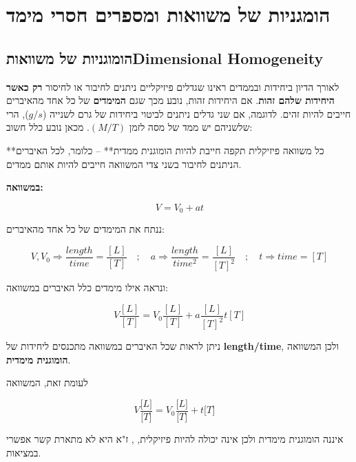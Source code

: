 \documentclass[
  hebrew,
  letterpaper,
  DIV=11,
  numbers=noendperiod]{scrreprt}
\begin{document}
\section{\texorpdfstring{{הומגניות של משוואות ומספרים חסרי
מימד}}{הומגניות של משוואות ומספרים חסרי מימד}}\label{ux5d4ux5d5ux5deux5d2ux5e0ux5d9ux5d5ux5ea-ux5e9ux5dc-ux5deux5e9ux5d5ux5d5ux5d0ux5d5ux5ea-ux5d5ux5deux5e1ux5e4ux5e8ux5d9ux5dd-ux5d7ux5e1ux5e8ux5d9-ux5deux5d9ux5deux5d3}

\subsection{\texorpdfstring{{הומוגניות של משוואות}Dimensional
Homogeneity{}}{הומוגניות של משוואותDimensional Homogeneity}}\label{ux5d4ux5d5ux5deux5d5ux5d2ux5e0ux5d9ux5d5ux5ea-ux5e9ux5dc-ux5deux5e9ux5d5ux5d5ux5d0ux5d5ux5eadimensional-homogeneity}

{לאורך הדיון ביחידות ובממדים ראינו שגדלים פיזיקליים ניתנים לחיבור או
לחיסור \textbf{רק כאשר היחידות שלהם זהות}}. {אם היחידות זהות, נובע מכך
שגם \textbf{המימדים} של כל אחד מהאיברים חייבים להיות זהים. לדוגמה, אם
שני גדלים ניתנים לביטוי ביחידות של גרם לשנייה} (\(g/s\)), {הרי שלשניהם
יש ממד של מסה לזמן} \((M/T)\). {מכאן נובע כלל חשוב}:

{**כל משוואה פיזיקלית תקפה חייבת להיות הומוגנית ממדית**} -- {כלומר, לכל
האיברים הניתנים לחיבור בשני צדי המשוואה חייבים להיות אותם ממדים}.

\textbf{במשוואה:}

\[
V = V_{0} + a t
\]

ננתח את המימדים של כל אחד מהאיברים:

\[
V, V_{0} \Longrightarrow \frac{length}{time} = \frac{[L]}{[T]} \quad ; \quad
a \Rightarrow \frac{length}{time^{2}} = \frac{[L]}{[T]^{2}} \quad ; \quad
t \Rightarrow time = [T]
\]

ונראה אילו מימדים כלל האיברים במשוואה:

\[
V \frac{[L]}{[T]} = V_{0} \frac{[L]}{[T]} + a \frac{[L]}{[T]^{2}} t [T]
\]

ניתן לראות שכל האיברים במשוואה מתכנסים ליחידות של \textbf{length/time},
ולכן המשוואה \textbf{הומוגנית מימדית}.

{לעומת זאת, המשוואה}

\[V\frac{\lbrack L\rbrack}{\lbrack T\rbrack} = V_{0}\frac{\lbrack L\rbrack}{\lbrack T\rbrack} + t\lbrack T\rbrack\ \ \ \ \ \mathbf{}\]

{איננה הומוגנית מימדית ולכן אינה יכולה להיות פיזיקלית, , ז"א היא לא
מתארת קשר אפשרי במציאות.}
\end{document}
